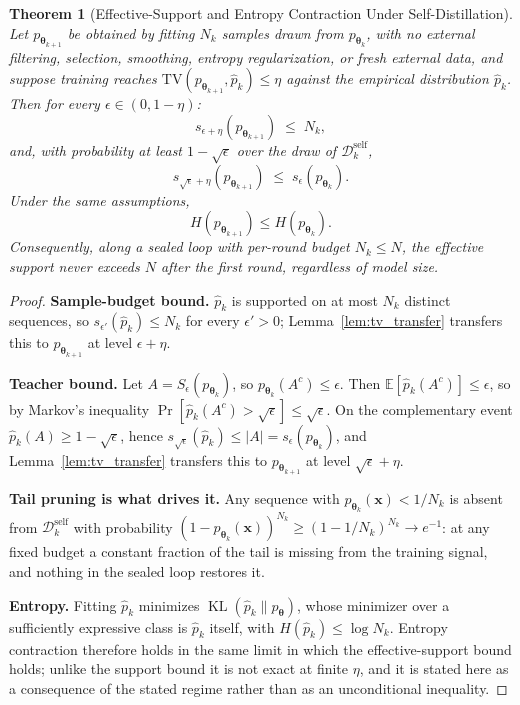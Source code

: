 \documentclass[11pt,a4paper]{article}
\newtheorem{theorem}{Theorem}[section]
\DeclareMathOperator{\KL}{KL}
\begin{document}
\begin{theorem}[Effective-Support and Entropy Contraction Under Self-Distillation]
\label{thm:collapse}
Let $p_{\bm{\theta}_{k+1}}$ be obtained by fitting $N_k$ samples drawn from $p_{\bm{\theta}_k}$, with no external filtering, selection, smoothing, entropy regularization, or fresh external data, and suppose training reaches $\mathrm{TV}(p_{\bm{\theta}_{k+1}}, \hat{p}_k) \leq \eta$ against the empirical distribution $\hat{p}_k$. Then for every $\epsilon \in (0, 1-\eta)$:
\begin{equation}
s_{\epsilon + \eta}(p_{\bm{\theta}_{k+1}}) \;\leq\; N_k ,
\end{equation}
and, with probability at least $1 - \sqrt{\epsilon}$ over the draw of $\mathcal{D}_k^{\mathrm{self}}$,
\begin{equation}
s_{\sqrt{\epsilon} + \eta}(p_{\bm{\theta}_{k+1}}) \;\leq\; s_\epsilon(p_{\bm{\theta}_k}) .
\end{equation}
Under the same assumptions,
\begin{equation}
H(p_{\bm{\theta}_{k+1}}) \leq H(p_{\bm{\theta}_k}) .
\end{equation}
Consequently, along a sealed loop with per-round budget $N_k \leq N$, the effective support never exceeds $N$ after the first round, regardless of model size.
\end{theorem}

\begin{proof}
\textbf{Sample-budget bound.} $\hat{p}_k$ is supported on at most $N_k$ distinct sequences, so $s_{\epsilon'}(\hat p_k) \leq N_k$ for every $\epsilon' > 0$; Lemma~\ref{lem:tv_transfer} transfers this to $p_{\bm{\theta}_{k+1}}$ at level $\epsilon + \eta$.

\textbf{Teacher bound.} Let $A = S_\epsilon(p_{\bm{\theta}_k})$, so $p_{\bm{\theta}_k}(A^c) \leq \epsilon$. Then $\mathbb{E}[\hat p_k(A^c)] \leq \epsilon$, so by Markov's inequality $\Pr[\hat p_k(A^c) > \sqrt{\epsilon}] \leq \sqrt{\epsilon}$. On the complementary event $\hat p_k(A) \geq 1 - \sqrt{\epsilon}$, hence $s_{\sqrt\epsilon}(\hat p_k) \leq |A| = s_\epsilon(p_{\bm{\theta}_k})$, and Lemma~\ref{lem:tv_transfer} transfers this to $p_{\bm{\theta}_{k+1}}$ at level $\sqrt{\epsilon} + \eta$.

\textbf{Tail pruning is what drives it.} Any sequence with $p_{\bm{\theta}_k}(\bm{x}) < 1/N_k$ is absent from $\mathcal{D}_k^{\mathrm{self}}$ with probability $(1 - p_{\bm{\theta}_k}(\bm{x}))^{N_k} \geq (1 - 1/N_k)^{N_k} \to e^{-1}$: at any fixed budget a constant fraction of the tail is missing from the training signal, and nothing in the sealed loop restores it.

\textbf{Entropy.} Fitting $\hat p_k$ minimizes $\KL(\hat p_k \| p_{\bm{\theta}})$, whose minimizer over a sufficiently expressive class is $\hat p_k$ itself, with $H(\hat p_k) \leq \log N_k$. Entropy contraction therefore holds in the same limit in which the effective-support bound holds; unlike the support bound it is not exact at finite $\eta$, and it is stated here as a consequence of the stated regime rather than as an unconditional inequality.
\end{proof}
\end{document}
